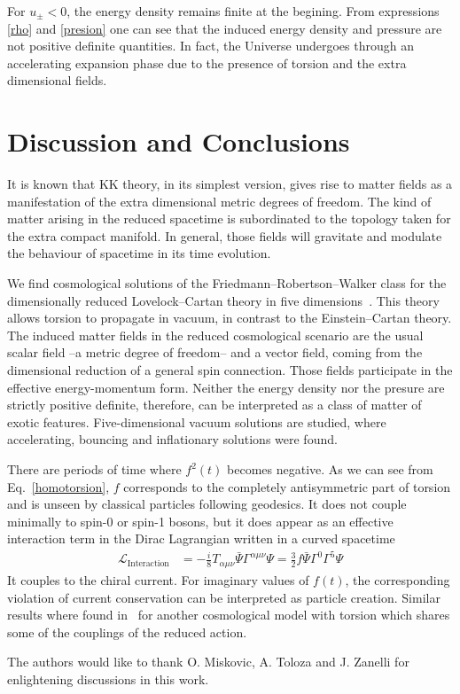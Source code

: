 \documentclass[aps,prd,12pt,superscriptaddress,showpacs,showkeys,longbibliography,reprint,nofootinbib]{revtex4-1}
\begin{document}
For $u_\pm<0$, the energy density remains finite at the begining. From expressions \eqref{rho} and \eqref{presion} one can see that the induced energy density and pressure are not positive definite quantities. In fact, the Universe undergoes through an accelerating expansion phase due to the presence of torsion and the extra dimensional fields. 


\section{Discussion and Conclusions\label{conclusions}}

It is known that KK theory, in its simplest version, gives rise to matter fields as a manifestation of the extra dimensional metric degrees of freedom. The kind of matter arising in the reduced spacetime is subordinated to the topology taken for the extra compact manifold. In general, those fields will gravitate and modulate the behaviour of spacetime in its time evolution. 

We find cosmological solutions of the Friedmann--Robertson--Walker class for the dimensionally reduced Lovelock--Cartan theory in five dimensions~\cite{Mardones:1990qc}. This theory allows torsion to propagate in vacuum, in contrast to the Einstein--Cartan theory. The induced matter fields in the reduced cosmological scenario are the usual scalar field --a metric degree of freedom-- and a vector field, coming from the dimensional reduction of a general spin connection. Those fields participate in the effective energy-momentum form. Neither the energy density nor the presure are strictly positive definite, therefore, can be interpreted as a class of matter of exotic features. Five-dimensional vacuum solutions are studied, where accelerating, bouncing and inflationary solutions were found.

There are periods of time where $f^2(t)$ becomes negative. As we can see from Eq.~\eqref{homotorsion}, $f$ corresponds to the completely antisymmetric part of torsion and is unseen by classical particles following geodesics. It does not couple minimally to spin-0 or spin-1 bosons, but it does appear as an effective interaction term in the Dirac Lagrangian written in a curved spacetime~\cite{Hehl:1976kj}
\begin{align*}
  \mathcal{L}_{\text{Interaction}}&=-\frac{i}{8}T_{\alpha\mu\nu}\bar{\Psi}\Gamma^{\alpha\mu\nu}\Psi =\frac{3}{2}f\bar{\Psi}\Gamma^0\Gamma^5\Psi
\end{align*}
It couples to the chiral current. For imaginary values of $f(t)$, the corresponding violation of current conservation can be interpreted as particle creation. Similar results where found in~\cite{Toloza:2013wi} for another cosmological model with torsion which shares some of the couplings of the reduced action. 
\begin{acknowledgments}
  The authors would like to thank O. Miskovic, A. Toloza and J. Zanelli for enlightening discussions in this work.
\end{acknowledgments}
\end{document}
